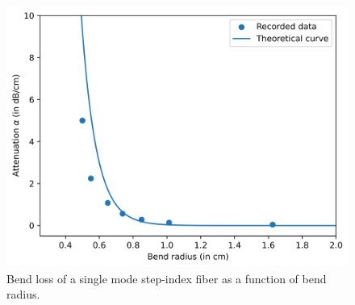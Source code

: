 \documentclass[%
 reprint,
nofootinbib,
 amsmath,amssymb,
 aps,
]{revtex4-2}
\begin{document}
\begin{figure}
	\includegraphics[scale=0.56]{bendloss}
	\caption{Bend loss of a single mode step-index fiber as a function of bend radius.}
	\label{fig:bendloss1}
\end{figure}
\end{document}
